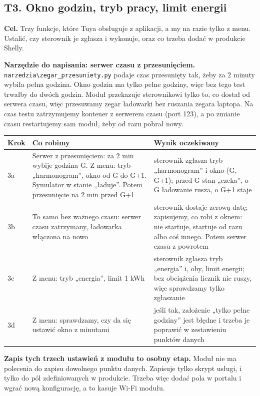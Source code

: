 \documentclass[11pt,a4paper]{article}
\begin{document}
\subsection{T3. Okno godzin, tryb pracy, limit energii}

\textbf{Cel.} Trzy funkcje, które Tuya obsługuje z aplikacji, a my na razie tylko z menu. Ustalić, czy sterownik je zgłasza i wykonuje, oraz co trzeba dodać w produkcie Shelly.


\textbf{Narzędzie do napisania: serwer czasu z przesunięciem.} \texttt{narzedzia\textbackslash{}zegar\_\allowbreak{}przesuniety.\allowbreak{}py} podaje czas przesunięty tak, żeby za 2 minuty wybiła pełna godzina. Okno godzin ma tylko pełne godziny, więc bez tego test trwałby do dwóch godzin. Moduł przekazuje sterownikowi tylko to, co dostał od serwera czasu, więc przesuwamy zegar ładowarki bez ruszania zegara laptopa. Na czas testu zatrzymujemy kontener z serwerem czasu (port 123), a po zmianie czasu restartujemy sam moduł, żeby od razu pobrał nowy.


\begin{longtable}{>{\raggedright\arraybackslash}p{3.00cm}>{\raggedright\arraybackslash}p{6.14cm}>{\raggedright\arraybackslash}p{6.14cm}}
\toprule
\rowcolor{apteallight}\textbf{Krok} & \textbf{Co robimy} & \textbf{Wynik oczekiwany} \\
\midrule\endhead
\bottomrule\endfoot
3a & Serwer z przesunięciem: za 2 min wybije godzina G. Z menu: tryb „harmonogram”, okno od G do G+1. Symulator w stanie „ładuje”. Potem przesunięcie na 2 min przed G+1 & sterownik zgłasza tryb „harmonogram” i okno (G, G+1); przed G stan „czeka”, o G ładowanie rusza, o G+1 staje \\
3b & To samo bez ważnego czasu: serwer czasu zatrzymany, ładowarka włączona na nowo & sterownik dostaje zerową datę; zapisujemy, co robi z oknem: nie startuje, startuje od razu albo coś innego. Potem serwer czasu z powrotem \\
3c & Z menu: tryb „energia”, limit 1 kWh & sterownik zgłasza tryb „energia” i, oby, limit energii; bez obciążenia licznik nie ruszy, więc sprawdzamy tylko zgłaszanie \\
3d & Z menu: sprawdzamy, czy da się ustawić okno z minutami & jeśli tak, założenie „tylko pełne godziny” jest błędne i trzeba je poprawić w zestawieniu punktów danych \\
\end{longtable}

\textbf{Zapis tych trzech ustawień z modułu to osobny etap.} Moduł nie ma polecenia do zapisu dowolnego punktu danych. Zapisuje tylko skrypt usługi, i tylko do pól zdefiniowanych w produkcie. Trzeba więc dodać pola w portalu i wgrać nową konfigurację, a to kasuje Wi-Fi modułu.
\end{document}
